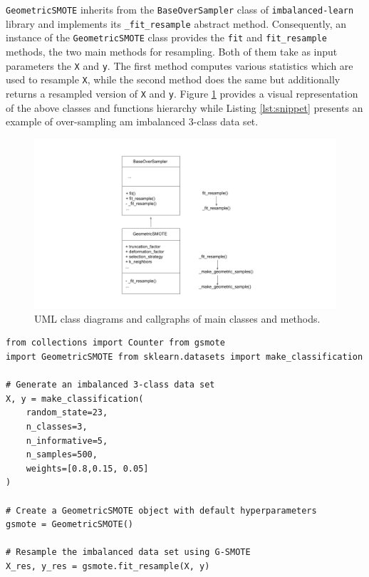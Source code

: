 \documentclass[twoside,11pt]{article}
\begin{document}
\texttt{GeometricSMOTE} inherits from the \texttt{BaseOverSampler} class of
\texttt{imbalanced-learn} library and implements its \texttt{\_fit\_resample}
abstract method. Consequently, an instance of the \texttt{GeometricSMOTE} class
provides the \texttt{fit} and \texttt{fit\_resample} methods, the two main
methods for resampling. Both of them take as input parameters the \texttt{X} and
\texttt{y}. The first method computes various statistics which are used to
resample \texttt{X}, while the second method does the same but additionally
returns a resampled version of \texttt{X} and \texttt{y}. Figure
\ref{fig:class_diagram} provides a visual representation of the above classes
and functions hierarchy while Listing \ref{lst:snippet} presents an example of
over-sampling am imbalanced 3-class data set.

\begin{figure}
	\centering
	\includegraphics[width=1\linewidth]{artifacts/class_diagram}
	\caption{UML class diagrams and callgraphs of main classes and methods.}
	\label{fig:class_diagram}
\end{figure} 

\begin{lstlisting}[language={iPython}, caption={ Code snippet to over-sample a data set using G-SMOTE.}, captionpos=b, label={lst:snippet}]
from collections import Counter from gsmote
import GeometricSMOTE from sklearn.datasets import make_classification

# Generate an imbalanced 3-class data set
X, y = make_classification(
	random_state=23, 
	n_classes=3, 
	n_informative=5, 
	n_samples=500, 
	weights=[0.8,0.15, 0.05]
)

# Create a GeometricSMOTE object with default hyperparameters
gsmote = GeometricSMOTE()

# Resample the imbalanced data set using G-SMOTE
X_res, y_res = gsmote.fit_resample(X, y) 
\end{lstlisting}
\end{document}

